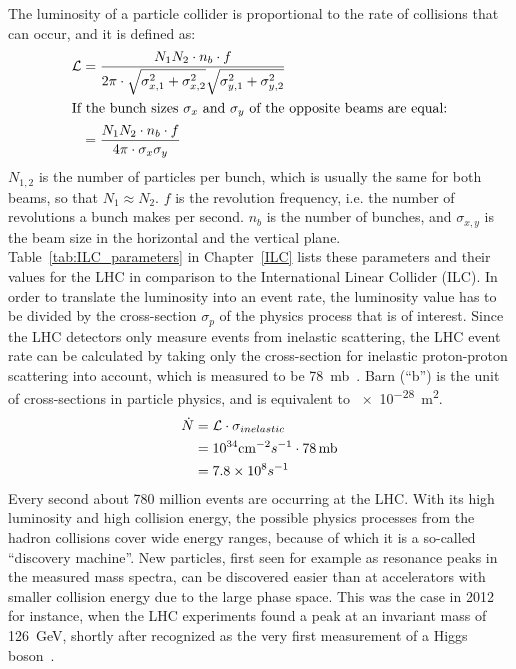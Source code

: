 The luminosity of a particle collider is proportional to the rate of collisions that can occur, and it is defined as:
\begin{align}
 \mathcal{L}&=\frac{N_1N_2 \cdot n_b \cdot f}{2\pi \cdot \sqrt{\sigma^2_{x,1}+\sigma^2_{x,2}} \sqrt{\sigma^2_{y,1}+\sigma^2_{y,2}}}\\
 \intertext{If the bunch sizes $\sigma_x$ and $\sigma_y$ of the opposite beams are equal:}
 &=\frac{N_1N_2 \cdot n_b \cdot f}{4\pi \cdot \sigma_x \sigma_y}
 \label{eq:luminosity}
\end{align}
$N_{1,2}$ is the number of particles per bunch, which is usually the same for both beams, so that $N_1\approx N_2$.
$f$ is the revolution frequency, i.e. the number of revolutions a bunch makes per second.
$n_{b}$ is the number of bunches, and $\sigma_{x,y}$ is the beam size in the horizontal and the vertical plane.
Table~\ref{tab:ILC_parameters} in Chapter~\ref{ILC} lists these parameters and their values for the LHC in comparison to the International Linear Collider (ILC).
In order to translate the luminosity into an event rate, the luminosity value has to be divided by the cross-section $\sigma_p$ of the physics process that is of interest.
Since the LHC detectors only measure events from inelastic scattering, the LHC event rate can be calculated by taking only the cross-section for inelastic proton-proton scattering into account, which is measured to be \SI{78}{\milli\barn}~\cite{inelXSection}.
Barn (``b'') is the unit of cross-sections in particle physics, and is equivalent to \SI{e-28}{\meter\squared}.
\begin{align}
 \dot{N}&=\mathcal{L}\cdot\sigma_{inelastic}\\
 &=10^{34} \textrm{cm}^{-2}s^{-1} \cdot 78\textrm{\,mb}\\
 &=7.8\times 10^8 s^{-1}
\end{align}
Every second about 780 million events are occurring at the LHC.
With its high luminosity and high collision energy, the possible physics processes from the hadron collisions cover wide energy ranges, because of which it is a so-called ``discovery machine''.
New particles, first seen for example as resonance peaks in the measured mass spectra, can be discovered easier than at accelerators with smaller collision energy due to the large phase space.
This was the case in 2012 for instance, when the LHC experiments found a peak at an invariant mass of \SI{126}{\GeV}, shortly after recognized as the very first measurement of a Higgs boson~\cite{Higgs}.\\
